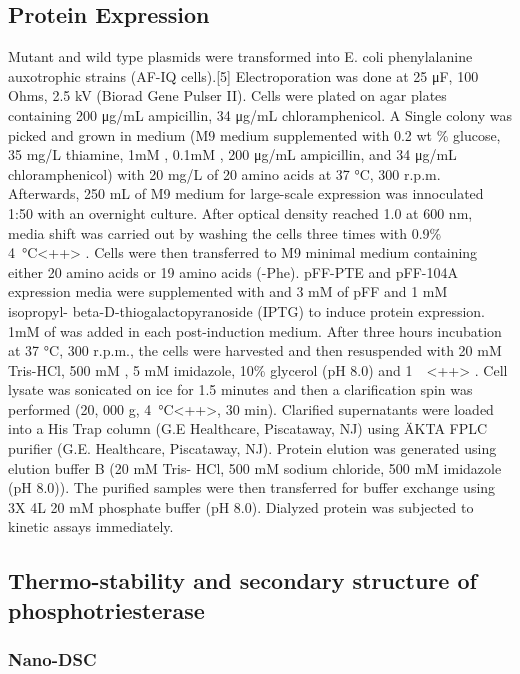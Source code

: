 \begin{refsection}
\subsection{Protein Expression}
Mutant and wild type plasmids were transformed into E. coli phenylalanine
auxotrophic strains (AF-IQ cells).[5] Electroporation was done at 25 μF, 100
Ohms, 2.5 kV (Biorad Gene Pulser II). Cells were plated on agar plates
containing 200 μg/mL ampicillin, 34 μg/mL chloramphenicol. A Single colony was
picked and grown in medium (M9 medium supplemented with 0.2 wt \% glucose, 35
mg/L thiamine, 1mM , 0.1mM , 200 μg/mL ampicillin, and 34 μg/mL
chloramphenicol) with 20 mg/L of 20 amino acids at 37 °C, 300 r.p.m.
Afterwards, 250 mL of M9 medium for large-scale expression was innoculated 1:50
with an overnight culture. After optical density reached 1.0 at 600 nm, media
shift was carried out by washing the cells three times with 0.9\%
\SI{4}{\celsius}<++> .  Cells were then transferred to M9 minimal
medium containing either 20 amino acids or 19 amino acids (-Phe). pFF-PTE and
pFF-104A expression media were supplemented with and 3 mM of pFF and 1 mM
isopropyl- beta-D-thiogalactopyranoside (IPTG) to induce protein expression.
1mM of  was added in each post-induction medium. After three hours
incubation at 37 °C, 300 r.p.m., the cells were harvested and then resuspended
with 20 mM Tris-HCl, 500 mM , 5 mM imidazole, 10\% glycerol (pH 8.0) and
\SI{1}{\micro\moLar}<++> . Cell lysate was sonicated on ice for 1.5
minutes and then a clarification spin was performed (20, 000 g,
\SI{4}{\celsius}<++>, 30 min).  Clarified supernatants were loaded into a His
Trap column (G.E Healthcare, Piscataway, NJ) using ÄKTA FPLC purifier (G.E.
Healthcare, Piscataway, NJ).  Protein elution was generated using elution
buffer B (20 mM Tris- HCl, 500 mM sodium chloride, 500 mM imidazole (pH 8.0)).
The purified samples were then transferred for buffer exchange using 3X 4L 20
mM phosphate buffer (pH 8.0).  Dialyzed protein was subjected to kinetic assays
immediately.

\subsection{Thermo-stability and secondary structure of phosphotriesterase}
\label{sec:thermo}

\subsubsection{Nano-DSC}


\end{refsection}
